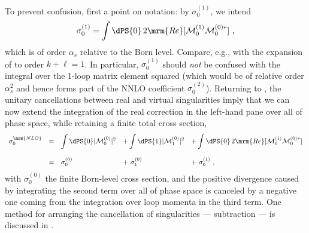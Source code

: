 To prevent confusion, first a point on notation: by 
$\sigma_0^{(1)}$, we intend
\begin{equation}
\sigma_0^{(1)} = \int \dPS{0} \, 2\mrm{Re}[{\cal M}_{0}^{(1)} {\cal M}_0^{(0)*}]~,
\end{equation}
which is of order $\alpha_s$ relative to the Born
level. 
Compare, e.g., with the expansion of
 to order $k+\ell = 1$. In particular, $\sigma_0^{(1)}$
should \emph{not} be confused with the integral over the 1-loop matrix
element squared (which would be of relative order $\alpha_s^2$ and
hence forms part of the NNLO coefficient $\sigma_0^{(2)}$). Returning
to , the unitary cancellations between real
and virtual singularities imply that we can now extend the
integration of the real correction in the left-hand pane over all of
phase space, while retaining a finite total cross section,
\begin{equation}
\begin{array}{rclll}
\displaystyle\sigma^\mrm{NLO}_0 & = 
 &\displaystyle\int \dPS{0} |{\cal M}^{(0)}_0|^2 
 & \displaystyle + \int \dPS{1}|{\cal M}^{(0)}_1|^2
 & \displaystyle + \int \dPS{0} \,2\mrm{Re}[{\cal M}_{0}^{(1)} {\cal M}_0^{(0)*}] 
\\[6mm]
 & = &\displaystyle \sigma^{(0)}_0
 & \displaystyle +\ \sigma^{(0)}_{1}
 & \displaystyle +\ \sigma^{(1)}_{0} 
~,\end{array} \label{eq:sigmaNLO}
\end{equation}
with $\sigma_0^{(0)}$ the finite Born-level cross section, 
and the positive divergence caused by integrating the second term over
all of phase space  is canceled by a negative one coming from the
integration over loop momenta in 
the third term. One method
for arranging the cancellation of singularities  --- subtraction --- is 
discussed in . 

